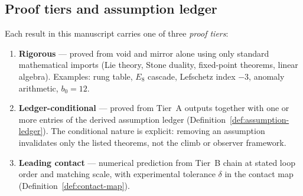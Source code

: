 \subsection{Proof tiers and assumption ledger}
\label{sec:semantic-closure}

\begin{definition}\label{def:proof-tiers}
Each result in this manuscript carries one of three \emph{proof tiers}:
\begin{enumerate}[label=\textbf{Tier~\Alph* :},leftmargin=*]
  \item \textbf{Rigorous} --- proved from void and mirror alone using only
    standard mathematical imports (Lie theory, Stone duality, fixed-point
    theorems, linear algebra). Examples: rung table, $E_8$ cascade, Lefschetz
    index $-3$, anomaly arithmetic, $b_0=12$.
  \item \textbf{Ledger-conditional} --- proved from Tier~A outputs together
    with one or more entries of the derived assumption ledger
    (Definition~\ref{def:assumption-ledger}). The conditional nature is
    explicit: removing an assumption invalidates only the listed theorems,
    not the climb or observer framework.
  \item \textbf{Leading contact} --- numerical prediction from Tier~B chain
    at stated loop order and matching scale, with experimental tolerance
    $\delta$ in the contact map (Definition~\ref{def:contact-map}).
\end{enumerate}
\end{definition}


